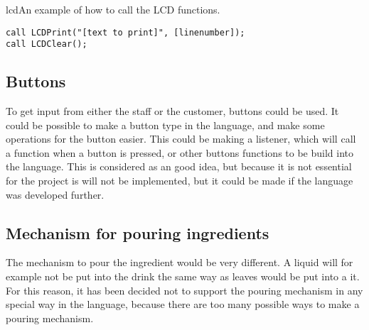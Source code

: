 \begin{code}{lcd}{An example of how to call the LCD functions.}
\begin{lstlisting}[mathescape]
call LCDPrint("[text to print]", [linenumber]);
call LCDClear();
\end{lstlisting}
\end{code}

\subsection{Buttons}
To get input from either the staff or the customer, buttons could be used. It could be possible to make a button type in the language, and make some operations for the button easier. This could be making a listener, which will call a function when a button is pressed, or other buttons functions to be build into the language. This is considered as an good idea, but because it is not essential for the project is will not be implemented, but it could be made if the language was developed further.

\subsection{Mechanism for pouring ingredients}
The mechanism to pour the ingredient would be very different. A liquid will for example not be put into the drink the same way as leaves would be put into a it. For this reason, it has been decided not to support the pouring mechanism in any special way in the language, because there are too many possible ways to make a pouring mechanism.

